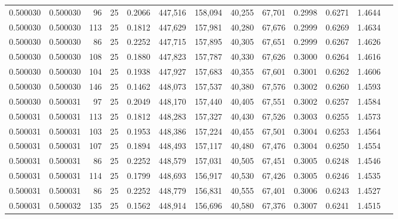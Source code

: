 \begin{tabular}{rrrrrrrrrrrrr}
0.500030 & 0.500030 &    96 &  25 &                                     0.2066 & 447,516 & 158,094 &  40,255 &  67,701 & 0.2998 & 0.6271 & 1.4644 \\
0.500030 & 0.500030 &   113 &  25 &                                     0.1812 & 447,629 & 157,981 &  40,280 &  67,676 & 0.2999 & 0.6269 & 1.4634 \\
0.500030 & 0.500030 &    86 &  25 &                                     0.2252 & 447,715 & 157,895 &  40,305 &  67,651 & 0.2999 & 0.6267 & 1.4626 \\
0.500030 & 0.500030 &   108 &  25 &                                     0.1880 & 447,823 & 157,787 &  40,330 &  67,626 & 0.3000 & 0.6264 & 1.4616 \\
0.500030 & 0.500030 &   104 &  25 &                                     0.1938 & 447,927 & 157,683 &  40,355 &  67,601 & 0.3001 & 0.6262 & 1.4606 \\
0.500030 & 0.500030 &   146 &  25 &                                     0.1462 & 448,073 & 157,537 &  40,380 &  67,576 & 0.3002 & 0.6260 & 1.4593 \\
0.500030 & 0.500031 &    97 &  25 &                                     0.2049 & 448,170 & 157,440 &  40,405 &  67,551 & 0.3002 & 0.6257 & 1.4584 \\
0.500031 & 0.500031 &   113 &  25 &                                     0.1812 & 448,283 & 157,327 &  40,430 &  67,526 & 0.3003 & 0.6255 & 1.4573 \\
0.500031 & 0.500031 &   103 &  25 &                                     0.1953 & 448,386 & 157,224 &  40,455 &  67,501 & 0.3004 & 0.6253 & 1.4564 \\
0.500031 & 0.500031 &   107 &  25 &                                     0.1894 & 448,493 & 157,117 &  40,480 &  67,476 & 0.3004 & 0.6250 & 1.4554 \\
0.500031 & 0.500031 &    86 &  25 &                                     0.2252 & 448,579 & 157,031 &  40,505 &  67,451 & 0.3005 & 0.6248 & 1.4546 \\
0.500031 & 0.500031 &   114 &  25 &                                     0.1799 & 448,693 & 156,917 &  40,530 &  67,426 & 0.3005 & 0.6246 & 1.4535 \\
0.500031 & 0.500031 &    86 &  25 &                                     0.2252 & 448,779 & 156,831 &  40,555 &  67,401 & 0.3006 & 0.6243 & 1.4527 \\
0.500031 & 0.500032 &   135 &  25 &                                     0.1562 & 448,914 & 156,696 &  40,580 &  67,376 & 0.3007 & 0.6241 & 1.4515 \\

\end{tabular}
